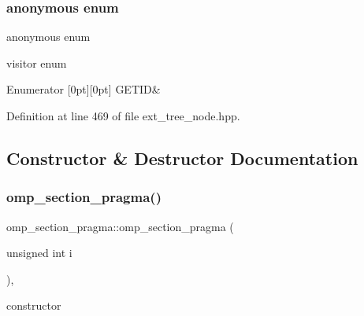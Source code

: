 \subsubsection{\texorpdfstring{anonymous enum}{anonymous enum}}
{\footnotesize\ttfamily anonymous enum}



visitor enum 

\begin{DoxyEnumFields}{Enumerator}
[0pt][0pt]{}\mbox{\label{structomp__section__pragma_a3ffe823a9327fe8a882bd7c8c232211eab23726486c733ed78bcde8f8733a95a2}} 
G\+E\+T\+ID&\\
\hline

\end{DoxyEnumFields}


Definition at line 469 of file ext\+\_\+tree\+\_\+node.\+hpp.



\subsection{Constructor \& Destructor Documentation}
\mbox{\label{structomp__section__pragma_a9018c5bd02b901872ff552d51e58527d}} 
\subsubsection{\texorpdfstring{omp\+\_\+section\+\_\+pragma()}{omp\_section\_pragma()}}
{\footnotesize\ttfamily omp\+\_\+section\+\_\+pragma\+::omp\+\_\+section\+\_\+pragma (\begin{DoxyParamCaption}\item[{unsigned int}]{i }\end{DoxyParamCaption})\hspace{0.3cm}{\ttfamily [inline]}, {\ttfamily [explicit]}}



constructor 




